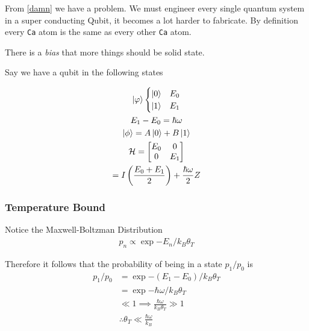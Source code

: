 \documentclass[reprint, amsmath,amssymb, aps]{revtex4-2}
\begin{document}
            From \ref{damn} we have a problem. We must engineer every single quantum system in a super conducting Qubit, it becomes a lot harder to fabricate. By definition every \texttt{Ca} atom is the same as every other \texttt{Ca} atom. 

            There is a \textit{bias} that more things should be solid state.

            Say we have a qubit in the following states

            \begin{gather*}
                \ket{\varphi} 
                \begin{cases}
                    \ket{0} & E_0 \\
                    \ket{1} & E_1
                \end{cases}
                \\
                E_1 - E_0 = \hbar\omega \\
                \ket{\phi} = A\ket{0} + B\ket{1}  \\
                \mathcal{H} = \begin{bmatrix} E_0 & 0 \\ 0 & E_1 \end{bmatrix} \\
                = I\left(\frac{E_0+E_1}{2}\right) + \frac{\hbar\omega}{2}Z
            \end{gather*}

        \subsubsection{Temperature Bound}
            Notice the Maxwell-Boltzman Distribution 
            \begin{align*}
                p_n \propto \exp{-E_n / k_B\theta_T}
            \end{align*}

            Therefore it follows that the probability of being in a state $p_1/p_0$ is 
            \begin{align*}
                p_1 / p_0 &= \exp{-(E_1-E_0)/k_B\theta_T} \\
                &= \exp{-\hbar\omega/k_B\theta_T} \\
                &\ll 1 \implies \frac{\hbar\omega}{k_B\theta_T} \gg 1 \\
                &\therefore \theta_T \ll  \frac{\hbar\omega}{k_B}
            \end{align*}
\end{document}
